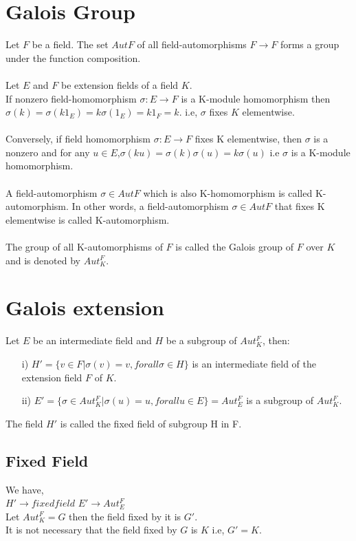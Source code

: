 \section{Galois Group}
Let \(F\) be a field. The set \(Aut F\) of all field-automorphisms \(F \rightarrow F \) forms a group under the function composition.\\ \\
Let \(E\) and \(F\) be extension fields of a field \(K\).\\
If nonzero field-homomorphism \(\sigma : E \rightarrow F\) is a K-module homomorphism then\\
\(\sigma(k)=\sigma(k1_E)=k\sigma(1_E)=k1_F=k\).\hspace{7mm}
i.e, \(\sigma\) fixes \(K\) elementwise.\\ \\
Conversely, if field homomorphism \(\sigma : E \rightarrow F\) fixes K elementwise, then \(\sigma\) is a nonzero and for any \(u \in E\),\(\sigma(ku)=\sigma(k)\sigma(u)=k\sigma(u)\)
i.e \(\sigma\) is a K-module homomorphism.\\ \\
A field-automorphism \(\sigma \in Aut F\) which is also K-homomorphism is called K-automorphism. In other words, a field-automorphism \(\sigma \in Aut F\) that fixes K elementwise is called K-automorphism.\\ \\
The group of all K-automorphisms of \(F\) is called the Galois group of \(F\) over \(K\) and is denoted by \(Aut_K^F\).

\section{Galois extension}
Let \(E\) be an intermediate field and \(H\) be a subgroup of \(Aut_K^F\), then:
\begin{enumerate}
\item[i)] \(H' = \{v \in F | \sigma(v)=v, for all \sigma \in H \}\) is an intermediate field of the extension field \(F\) of \(K\).
\item[ii)] \(E' = \{\sigma \in Aut_K^F | \sigma(u)=u, for all u \in E\}=Aut_E^F\) is a subgroup of \(Aut_K^F\).
\end{enumerate}

The field \(H'\) is called the fixed field of subgroup H in F.

\subsection{Fixed Field}
We have,\\
\(H' \rightarrow fixed field \) \hspace{5mm} \(E' \rightarrow Aut_E^F\)\\
Let \(Aut_K^F = G\) then the field fixed by it is \(G'\).\\
It is not necessary that the field fixed by \(G\) is \(K\) i.e, \(G'=K\).\\

